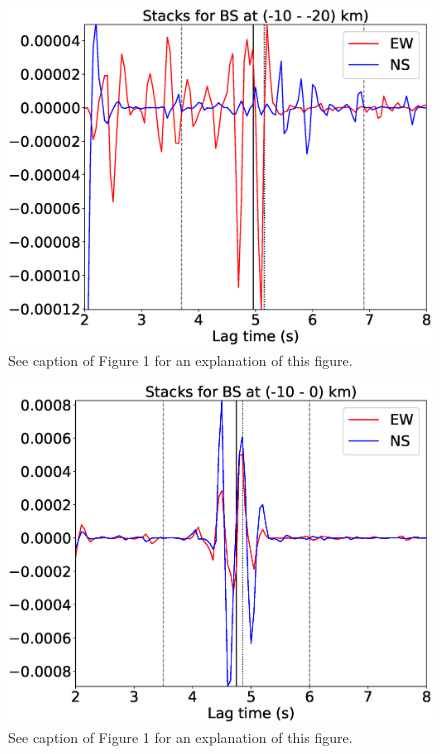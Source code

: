 \documentclass[letterpaper, 12pt]{article}
\begin{document}
\begin{figure}[H]
\includegraphics[width=\linewidth]{figures/intervals/BS_-10_-20_stacks.eps}
\caption{See caption of Figure 1 for an explanation of this figure.}
\end{figure}

\begin{figure}[H]
\includegraphics[width=\linewidth]{figures/intervals/BS_-10_000_stacks.eps}
\caption{See caption of Figure 1 for an explanation of this figure.}
\end{figure}
\end{document}
